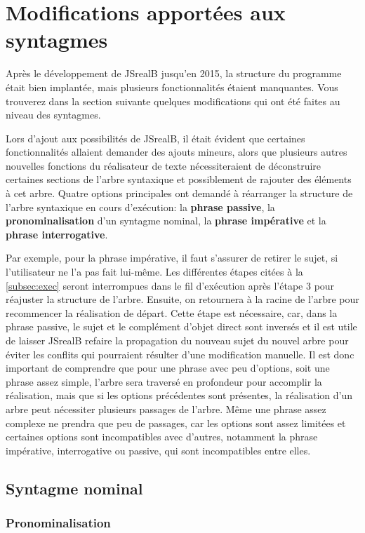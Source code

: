 \documentclass[11pt]{article} %
\newcommand{\system}[1]{\textsf{#1}}
\newcommand{\JSB}{\system{JSrealB}}
\begin{document}
\section{Modifications apportées aux syntagmes}
Après le développement de \JSB{} jusqu'en 2015, la structure du programme
était bien implantée, mais plusieurs fonctionnalités étaient manquantes.
Vous trouverez dans la section suivante quelques modifications qui
ont été faites au niveau des syntagmes.

Lors d'ajout aux possibilités de \JSB{}, il était évident
que certaines fonctionnalités allaient demander des ajouts mineurs,
alors que plusieurs autres nouvelles fonctions du réalisateur de texte nécessiteraient
de déconstruire certaines sections de l'arbre syntaxique et possiblement
de rajouter des éléments à cet arbre. Quatre options principales ont
demandé à réarranger la structure de l'arbre syntaxique en cours d'exécution:
la \textbf{phrase passive}, la \textbf{pronominalisation} d'un syntagme
nominal, la \textbf{phrase impérative} et la \textbf{phrase interrogative}.


Par exemple, pour la phrase impérative, il faut s'assurer de retirer
le sujet, si l'utilisateur ne l'a pas fait lui-même. Les différentes
étapes citées à la \autoref{subsec:exec} seront interrompues dans le fil d'exécution
après l'étape 3 pour réajuster la structure de l'arbre. Ensuite, on
retournera à la racine de l'arbre pour recommencer la réalisation
de départ. Cette étape est nécessaire, car, dans la phrase passive,
le sujet et le complément d'objet direct sont inversés et il est utile
de laisser \JSB{} refaire la propagation du nouveau sujet du nouvel
arbre pour éviter les conflits qui pourraient résulter d'une modification
manuelle. Il est donc important de comprendre que pour une phrase
avec peu d'options, soit une phrase assez simple, l'arbre sera traversé
en profondeur pour accomplir la réalisation, mais que si les options
précédentes sont présentes, la réalisation d'un arbre peut nécessiter
plusieurs passages de l'arbre. Même une phrase assez complexe
ne prendra que peu de passages, car les options sont assez limitées
et certaines options sont incompatibles avec d'autres, notamment la
phrase impérative, interrogative ou passive, qui sont incompatibles
entre elles.

\subsection{Syntagme nominal}

\subsubsection{Pronominalisation}
\label{pronomi}
\end{document}
